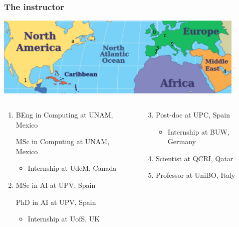 \documentclass[xcolor=x11names]{beamer}
\begin{document}
\begin{frame}
\frametitle{The instructor}
 
\begin{center}
\includegraphics[width=120mm]{img/01_dit_compthink_map.png}
\end{center}

\begin{columns}
\footnotesize
\begin{column}{0.5\textwidth}

\begin{enumerate}
 \item BEng in Computing at UNAM, Mexico
 
	MSc in Computing at UNAM, Mexico
	\vspace{-1mm}
	
	\begin{itemize}
	 \item Internship at UdeM, Canada
	\end{itemize}						\pause 
	
 \item MSc in AI at UPV, Spain
 
 PhD in AI at UPV, Spain
 \vspace{-1mm}
 
 \begin{itemize}
	 \item Internship at UofS, UK%
	\end{itemize}						\pause 
\end{enumerate}
\end{column}

\begin{column}{0.5\textwidth}

\begin{enumerate}\setcounter{enumi}{2}
 \item Post-doc at UPC, Spain
 \vspace{-1mm}
 
	\begin{itemize}
	 \item Internship at BUW, Germany
	\end{itemize}							\pause 

 \item Scientist at QCRI, Qatar				\pause 
 \bigskip 
 
 \item Professor at UniBO, Italy
\end{enumerate}
\vspace{1mm}
\end{column}
\end{columns}
\end{frame}
\end{document}
